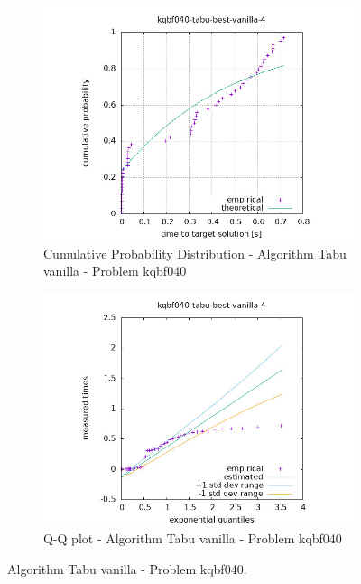 \begin{figure}[H]
    \centering
    \begin{subfigure}{0.49\textwidth}
        \includegraphics[width=\textwidth]{figure/ttt_plot/kqbf040-tabu-best-vanilla-4-exp.jpeg}
        \caption{Cumulative Probability Distribution - Algorithm Tabu vanilla - Problem kqbf040}
        \label{fig:tabu-vanilla-kqbf040-exp}
    \end{subfigure}
    \hfill
    \begin{subfigure}{0.49\textwidth}
        \includegraphics[width=\textwidth]{figure/ttt_plot/kqbf040-tabu-best-vanilla-4-qq.jpeg}
        \caption{Q-Q plot - Algorithm Tabu vanilla - Problem kqbf040}
        \label{fig:tabu-vanilla-kqbf040-qq}
    \end{subfigure}
    \caption{Algorithm Tabu vanilla - Problem kqbf040.}
    \label{fig:tabu-vanilla-kqbf040}
\end{figure}


